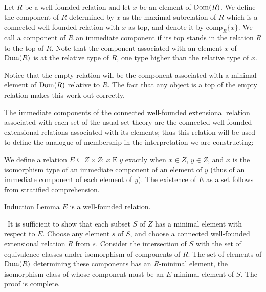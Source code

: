 \begin{definition}
 Let $R$ be a well-founded relation and let $x$ be
 an element of $\mathop{\mathrm{Dom}}(R)$.  We define the {\upshape component} of $R$
 determined by $x$ as the maximal subrelation of $R$ which is a
 connected well-founded relation with $x$ as top, and denote it by
 $\mathrm{comp}_R\{x\}$.  We call a component of $R$ an {\upshape immediate
 component} if its top stands in the relation $R$ to the top of
 $R$.  Note that the component associated with an element $x$ of
 $\mathop{\mathrm{Dom}}(R)$ is at the relative type of $R$, one type
 higher than the relative type of $x$.
\end{definition}

Notice that the empty relation will be
the component associated with a minimal element of $\mathop{\mathrm{Dom}}(R)$ relative to $R$.
The fact that any object is a top of the empty relation makes this work out
correctly.

The immediate components of the connected well-founded extensional
relation associated with
each set of the usual set theory are the 
connected well-founded extensional relations associated with its
elements; thus this relation will be used to define the analogue of
membership in the interpretation we are constructing:

\begin{definition}
 We define a relation $E \subseteq Z \times Z$: $x
 \mathrel{E} y$ exactly when $x \in Z$, $y \in Z$, and $x$ is the
 isomorphism type of an immediate component of an
 element of $y$ (thus of an immediate component of each element of $y$).  The
 existence of $E$ as a set follows from stratified
 comprehension.
\end{definition}

\begin{Lemme}{Induction Lemma}
  $E$ is a well-founded relation.
\end{Lemme}

\preuve\ It is sufficient to show that each
subset $S$ of $Z$ has a minimal element with respect to $E$.
Choose any element $s$ of $S$, and choose a connected well-founded
extensional relation $R$ from $s$.  Consider the intersection of $S$
with the set of equivalence classes under isomorphism of components 
of $R$.  The set of elements of $\mathop{\mathrm{Dom}}(R)$
determining these components has an $R$-minimal element, the
isomorphism class of whose component must be an $E$-minimal element
of $S$.  The proof is complete.\linebreak
\finpreuve

